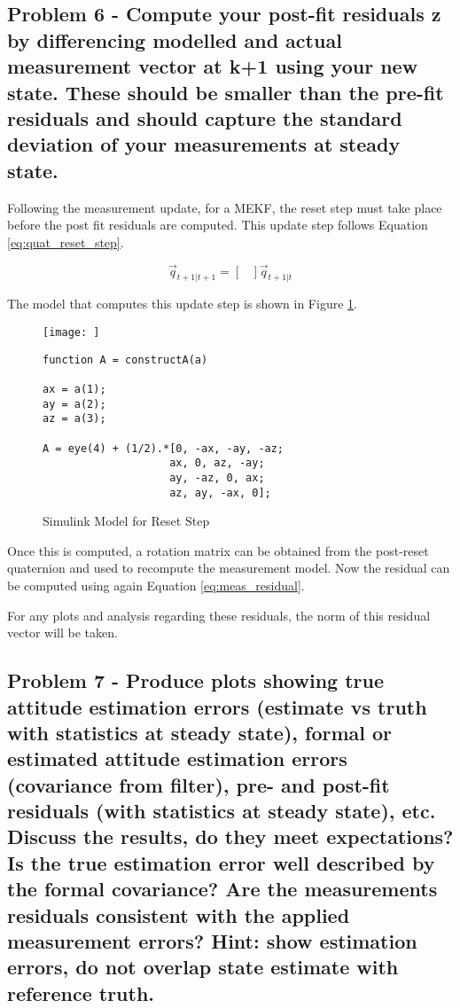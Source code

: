 \subsection{Problem 6 - Compute your post-fit residuals z by differencing modelled and actual measurement vector at k+1 using your new state. These should be smaller than the pre-fit residuals and should capture the standard deviation of your measurements at steady state.}

Following the measurement update, for a MEKF, the reset step must take place before the post fit residuals are computed. This update step follows Equation \ref{eq:quat_reset_step}.

\begin{equation} \label{eq:quat_reset_step}
    \vec{q}_{t+1 \vert t+1} = \begin{bmatrix}
        
    \end{bmatrix} \vec{q}_{t+1 \vert t}
\end{equation}

The model that computes this update step is shown in Figure \ref{fig:quat_reset_step}.

\begin{figure}[H]
    \centering
    \captionsetup{ justification = centering }
    \texttt{[image: ]}
    \begin{lstlisting}
function A = constructA(a)

ax = a(1);
ay = a(2);
az = a(3);

A = eye(4) + (1/2).*[0, -ax, -ay, -az;
                    ax, 0, az, -ay;
                    ay, -az, 0, ax;
                    az, ay, -ax, 0];
    \end{lstlisting}
    \caption{Simulink Model for Reset Step}
    \label{fig:quat_reset_step}
\end{figure}

Once this is computed, a rotation matrix can be obtained from the post-reset quaternion and used to recompute the measurement model. Now the residual can be computed using again Equation \ref{eq:meas_residual}.

For any plots and analysis regarding these residuals, the norm of this residual vector will be taken.

\subsection{Problem 7 - Produce plots showing true attitude estimation errors (estimate vs truth with statistics at steady state), formal or estimated attitude estimation errors (covariance from filter), pre- and post-fit residuals (with statistics at steady state), etc. Discuss the results, do they meet expectations? Is the true estimation error well described by the formal covariance? Are the measurements residuals consistent with the applied measurement errors? Hint: show estimation errors, do not overlap state estimate with reference truth.}

